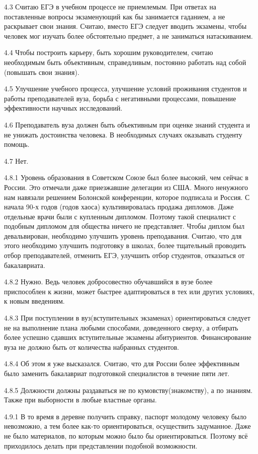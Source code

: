 4.3 Считаю ЕГЭ в учебном процессе не приемлемым. При ответах на поставленные вопросы экзаменующий как бы  занимается гаданием, а не раскрывает свои знания. Считаю, вместо ЕГЭ следует вводить экзамены, чтобы человек мог изучать более обстоятельно предмет, а не заниматься натаскиванием.

4.4 Чтобы построить карьеру, быть хорошим руководителем, считаю необходимым быть объективным, справедливым, постоянно работать над собой (повышать свои знания).

4.5 Улучшение учебного процесса, улучшение условий проживания студентов и работы преподавателей вуза, борьба с негативными процессами, повышение эффективности научных исследований.

4.6 Преподаватель вуза должен быть объективным при оценке знаний студента и не унижать достоинства человека. В необходимых случаях оказывать студенту помощь.

4.7 Нет.

4.8.1 Уровень образования в Советском Союзе был более высокий, чем сейчас в России. Это отмечали даже приезжавшие делегации из США. Много ненужного нам навязали решением Болонской конференции, которое подписала и Россия. С начала 90-х годов (годов хаоса) культивировалась продажа дипломов. Даже отдельные врачи были с купленным дипломом. Поэтому такой специалист с подобным дипломом для общества ничего не представляет. Чтобы диплом был девальвирован, необходимо улучшить уровень преподавания. Считаю, что для этого необходимо улучшить подготовку в школах, более тщательный проводить отбор преподавателей, отменить ЕГЭ, улучшить отбор студентов, отказаться от бакалавриата.

4.8.2 Нужно. Ведь человек добросовестно обучавшийся в вузе более приспособлен к жизни, может быстрее адаптироваться в тех или других условиях, к новым введениям.

4.8.3 При поступлении в вуз(вступительных экзаменах) ориентироваться следует не на выполнение плана любыми способами, доведенного сверху, а отбирать более успешно сдавших вступительные экзамены абитуриентов. Финансирование вуза не должно быть от количества набранных студентов.

4.8.4 Об этом я уже высказался. Считаю, что для России более эффективным было заменить бакалавриат подготовкой специалистов в течение пяти лет.

4.8.5 Должности должны раздаваться не по кумовству(знакомству), а по знаниям. Также при выборности в любые властные органы.

4.9.1 В то время в деревне получить справку, паспорт молодому человеку было невозможно, а тем более как-то ориентироваться, осуществить задуманное. Даже не было материалов, по которым можно было бы ориентироваться. Поэтому всё приходилось делать при представлении подобной возможности.

